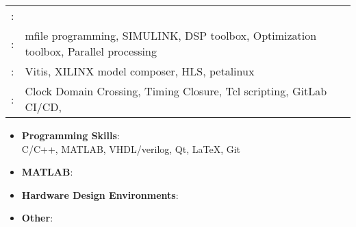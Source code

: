 
\begin{tabular}{>{}r>{}p{11cm}}
	\textsc{:}            &                                       \\
	\textsc{:}                        & mfile programming, SIMULINK, DSP toolbox, Optimization toolbox, Parallel processing \\
	\textsc{ :} & Vitis, XILINX model composer, HLS, petalinux                                        \\
	\textsc{:}                         & Clock Domain Crossing, Timing Closure, Tcl scripting, GitLab CI/CD,
\end{tabular}

\begin{itemize}
	\item \textbf{Programming Skills}:
	\\ \quad	C/C++, MATLAB, VHDL/verilog, Qt, \LaTeX,   Git
	\item \textbf{MATLAB}:

	\item \textbf{Hardware Design Environments}:

	\item \textbf{Other}:
\end{itemize}